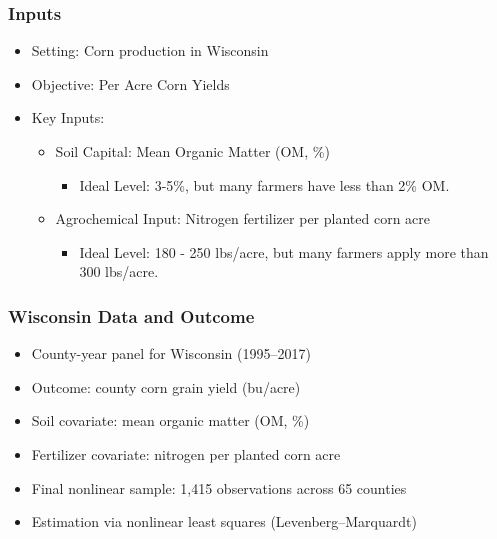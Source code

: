 \documentclass[xcolor = x11names, compress, aspectratio = 169]{beamer}
\renewcommand{\(}{\begin{columns}}
\renewcommand{\)}{\end{columns}}
\newcommand{\<}[1]{\begin{column}{#1}}
\renewcommand{\>}{\end{column}}
\begin{document}
    \begin{frame}
    \frametitle{Inputs}
    \begin{itemize}
        \item Setting: Corn production in Wisconsin
        \item Objective: Per Acre Corn Yields 
        \item Key Inputs:
        \begin{itemize}
            \item Soil Capital: Mean Organic Matter (OM, \%)
            \begin{itemize}
                \item Ideal Level: 3-5\%, but many farmers have less than 2\% OM. {\scriptsize\citep{UMNExtSOM, UWExtA3588}}
            \end{itemize}
            \item Agrochemical Input: Nitrogen fertilizer per planted corn acre
            \begin{itemize}
                \item Ideal Level: 180 - 250 lbs/acre, but many farmers apply more than 300 lbs/acre. {\scriptsize\citep{NASS2022Corn, ERSFertilizer}}
            \end{itemize}
        \end{itemize}
    \end{itemize}
    \end{frame}
        \begin{frame}
    \frametitle{Wisconsin Data and Outcome}
        \begin{itemize}
            \item County-year panel for Wisconsin (1995--2017)
            \item Outcome: county corn grain yield (bu/acre)
            \item Soil covariate: mean organic matter (OM, \%)
            \item Fertilizer covariate: nitrogen per planted corn acre
            \item Final nonlinear sample: 1,415 observations across 65 counties
            \item Estimation via nonlinear least squares (Levenberg--Marquardt)
        \end{itemize}
    \end{frame}
\end{document}
